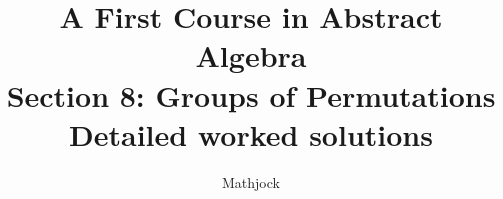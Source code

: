 
\title{\textbf{A First Course in Abstract Algebra}\\[0.3em]Section 8: Groups of Permutations\\[0.3em]\large Detailed worked solutions}
\author{Mathjock}
\date{}

\maketitle
\bookinfo
\tableofcontents
\clearpage
\renewcommand{\thesection}{8}
\renewcommand{\theHsection}{fraleigh.8}


